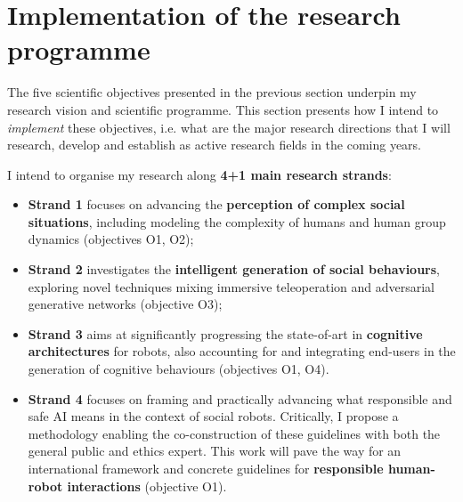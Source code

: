 



\vspace{3em}
\section{Implementation of the research programme}


The five scientific objectives presented in the previous section underpin my
research vision and scientific programme. This section presents how I intend
to \emph{implement} these objectives, i.e.  what are the major research
directions that I will research, develop and establish as active research fields
in the coming years.

\vspace{0.5em}
I intend to organise my research along \textbf{4+1 main research
strands}:

\vspace{0.5em}
\begin{itemize}
    \item {\bf Strand 1} focuses on advancing the \textbf{perception of complex social
        situations}, including modeling the complexity of humans and human group
        dynamics (objectives O1, O2);
    \item {\bf Strand 2} investigates the \textbf{intelligent generation of social
        behaviours}, exploring novel techniques mixing immersive teleoperation
        and adversarial generative networks (objective O3);
    \item {\bf Strand 3} aims at significantly progressing the state-of-art in
        \textbf{cognitive architectures} for robots, also accounting for and integrating
        end-users in the generation of cognitive behaviours (objectives O1, O4).
    \item {\bf Strand 4} focuses on framing and practically advancing what
        responsible and safe AI means in the context of social robots.
        Critically, I propose a methodology enabling the co-construction of
        these guidelines with both the general public and ethics expert. This
        work will pave the way for an international framework and concrete
        guidelines for \textbf{responsible
        human-robot interactions} (objective O1).
\end{itemize}
\vspace{0.5em}


